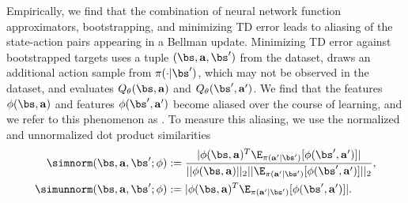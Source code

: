 Empirically, we find that the combination of neural network function approximators, bootstrapping, and minimizing TD error 
leads to aliasing
of the state-action pairs appearing in a Bellman update. Minimizing TD error against bootstrapped targets uses a tuple $(\bs, \mathbf{a}, \bs')$ from the dataset, draws an additional action sample from $\pi(\cdot | \bs')$, which may not be observed in the dataset, and evaluates $Q_\theta(\bs, \mathbf{a})$ and $Q_\theta(\bs', \mathbf{a}')$. We find that the features $\phi(\bs, \mathbf{a})$ and features $\phi(\bs', \mathbf{a}')$ become aliased over the course of learning,
and we refer to this phenomenon as \emph{\aliasingproblemname}.
To measure this aliasing, we use the normalized and unnormalized dot product similarities %
\begin{align*}
    \simnorm(\bs, \mathbf{a}, \bs'; \phi) &:= \frac{|\phi(\bs, \mathbf{a})^T \E_{\pi(\mathbf{a}'|\bs')}[\phi(\bs', \mathbf{a}')]|}{||\phi(\bs, \mathbf{a})||_2 ||\E_{\pi(\mathbf{a}'|\bs')}[\phi(\bs', \mathbf{a}')]||_2},\\
    \simunnorm(\bs, \mathbf{a}, \bs'; \phi) &:= |\phi(\bs, \mathbf{a})^T \E_{\pi(\mathbf{a}'|\bs')}[\phi(\bs', \mathbf{a}')]|.
\end{align*}

